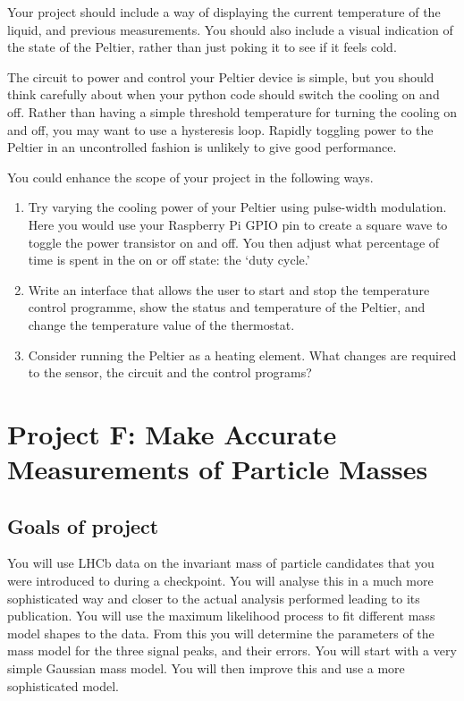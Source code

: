 Your project should include a way of displaying the current temperature of the liquid, and previous measurements.
You should also include a visual indication of the state of the Peltier, rather than just poking it to see if it feels cold.

The circuit to power and control your Peltier device is simple, but you should think carefully about when your python code should switch the cooling on and off.
Rather than having a simple threshold temperature for turning the cooling on and off, you may want to use a hysteresis loop.
Rapidly toggling power to the Peltier in an uncontrolled fashion is unlikely to give good performance.

You could enhance the scope of your project in the following ways.
\begin{enumerate}
	\item Try varying the cooling power of your Peltier using pulse-width modulation.
		Here you would use your Raspberry Pi GPIO pin to create a square wave to toggle the power transistor on and off.
		You then adjust what percentage of time is spent in the on or off state: the `duty cycle.'
	\item Write an interface that allows the user to start and stop the temperature control programme, show the status and temperature of the Peltier, and change the temperature value of the thermostat.
	\item Consider running the Peltier as a heating element. What changes are required to the sensor, the circuit and the control programs?
\end{enumerate}


 
 
 
\newpage
\section{Project F: Make Accurate Measurements of Particle Masses}

\subsection{Goals of project}

You will use LHCb data on the invariant mass of particle candidates that you were introduced to during a checkpoint. You will analyse this in a much more sophisticated way and closer to the actual analysis performed leading to its publication. You will use the maximum likelihood process to fit different mass model shapes to the data. From this you will determine the parameters of the mass model for the three signal peaks, and their errors. You will start with a very simple Gaussian mass model. You will then improve this and use a more sophisticated model.

